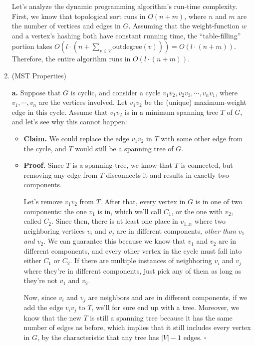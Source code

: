 \documentclass{article}
\begin{document}
\begin{enumerate}
    Let's analyze the dynamic programming algorithm's run-time complexity. First, we know that topological sort runs in $O(n + m)$, where $n$ and $m$ are the number of vertices and edges in $G$. Assuming that the weight-function $w$ and a vertex's hashing both have constant running time, the ``table-filling'' portion takes $O(l \cdot (n + \sum_{v \in V}\text{outdegree}(v))) = O(l \cdot (n + m))$. Therefore, the entire algorithm runs in $O(l \cdot (n + m))$.

    \pagebreak

  \item (MST Properties)

    \textbf{a.} Suppose that $G$ is cyclic, and consider a cycle $v_1v_2, v_2v_3, \cdots, v_nv_1$, where $v_1, \cdots, v_n$ are the vertices involved. Let $v_1v_2$ be the (unique) maximum-weight edge in this cycle. Assume that $v_1v_2$ is in a minimum spanning tree $T$ of $G$, and let's see why this cannot happen:
    \begin{itemize}
      \item \textbf{Claim.} We could replace the edge $v_1v_2$ in $T$ with some other edge from the cycle, and $T$ would still be a spanning tree of $G$.
      \item \textbf{Proof.} Since $T$ is a spanning tree, we know that $T$ is connected, but removing any edge from $T$ disconnects it and results in exactly two components.

        Let's remove $v_1v_2$ from $T$. After that, every vertex in $G$ is in one of two components: the one $v_1$ is in, which we'll call $C_1$, or the one with $v_2$, called $C_2$. Since then, there is at least one place in $v_{1..n}$ where two neighboring vertices $v_i$ and $v_j$ are in different components, \textit{other than $v_1$ and $v_2$}. We can guarantee this because we know that $v_1$ and $v_2$ are in different components, and every other vertex in the cycle must fall into either $C_1$ or $C_2$. If there are multiple instances of neighboring $v_i$ and $v_j$ where they're in different components, just pick any of them as long as they're not $v_1$ and $v_2$.

        Now, since $v_i$ and $v_j$ are neighbors and are in different components, if we add the edge $v_iv_j$ to $T$, we'll for sure end up with a tree. Moreover, we know that the new $T$ is still a spanning tree because it has the same number of edges as before, which implies that it still includes every vertex in $G$, by the characteristic that any tree has $|V| - 1$ edges. $\square$
    \end{itemize}


\end{enumerate}
\end{document}
